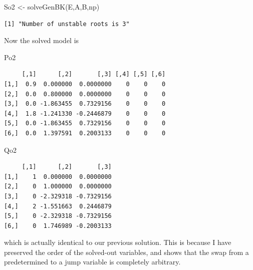\documentclass[
  letterpaper,
]{book}
\newenvironment{Shaded}{\begin{snugshade}}{\end{snugshade}}
\newcommand{\FunctionTok}[1]{\textcolor[rgb]{0.28,0.35,0.67}{#1}}
\newcommand{\NormalTok}[1]{\textcolor[rgb]{0.00,0.23,0.31}{#1}}
\newcommand{\OtherTok}[1]{\textcolor[rgb]{0.00,0.23,0.31}{#1}}
\newcommand{\SpecialCharTok}[1]{\textcolor[rgb]{0.37,0.37,0.37}{#1}}
\begin{document}
\begin{Shaded}
\begin{Highlighting}[]
\NormalTok{So2 }\OtherTok{\textless{}{-}} \FunctionTok{solveGenBK}\NormalTok{(E,A,B,np)}
\end{Highlighting}
\end{Shaded}

\begin{verbatim}
[1] "Number of unstable roots is 3"
\end{verbatim}

\begin{Shaded}
\end{Shaded}

Now the solved model is

\begin{Shaded}
\begin{Highlighting}[]
\NormalTok{Po2}
\end{Highlighting}
\end{Shaded}

\begin{verbatim}
     [,1]      [,2]       [,3] [,4] [,5] [,6]
[1,]  0.9  0.000000  0.0000000    0    0    0
[2,]  0.0  0.800000  0.0000000    0    0    0
[3,]  0.0 -1.863455  0.7329156    0    0    0
[4,]  1.8 -1.241330 -0.2446879    0    0    0
[5,]  0.0 -1.863455  0.7329156    0    0    0
[6,]  0.0  1.397591  0.2003133    0    0    0
\end{verbatim}

\begin{Shaded}
\begin{Highlighting}[]
\NormalTok{Qo2}
\end{Highlighting}
\end{Shaded}

\begin{verbatim}
     [,1]      [,2]       [,3]
[1,]    1  0.000000  0.0000000
[2,]    0  1.000000  0.0000000
[3,]    0 -2.329318 -0.7329156
[4,]    2 -1.551663  0.2446879
[5,]    0 -2.329318 -0.7329156
[6,]    0  1.746989 -0.2003133
\end{verbatim}

which is actually identical to our previous solution. This is because I
have preserved the order of the solved-out variables, and shows that the
swap from a predetermined to a jump variable is completely arbitrary.
\end{document}
